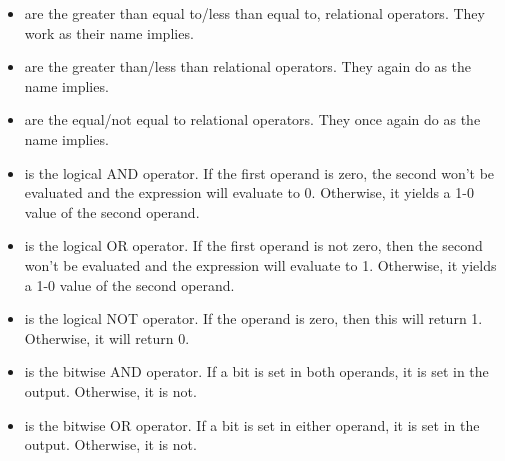 \begin{itemize}
	      \begin{itemize}
		    \item If the operand on the left is signed, then the integer is sign-extended.
          This means that if the number has the sign bit set, then any shift right will introduce ones on the left.
          If the number does not have the sign bit set, any shift right will introduce zeros on the left.
		      \item If the operand is unsigned, zeros will be introduced on the left either way.
	      \end{itemize}

	      \begin{lstlisting}[language=C]
unsigned short uns = -127; // 1111111110000001
short sig = 1; // 0000000000000001
uns << 2; // 1111111000000100
sig << 2; // 0000000000000100
uns >> 2; // 0011111111100000
sig >> 2; // 0000000000000000
\end{lstlisting}
    Note that shifting by the word size (e.g. by 64 in a 64-bit architecture) results in undefined behavior.
	\item \keyword{<=/>=} are the greater than equal to/less than equal to, relational operators.
    They work as their name implies.
	\item \keyword{</>} are the greater than/less than relational operators.
    They again do as the name implies.
	\item \keyword{==/\!=} are the equal/not equal to relational operators.
    They once again do as the name implies.
	\item \keyword{\&\&} is the logical AND operator.
    If the first operand is zero, the second won't be evaluated and the expression will evaluate to 0. Otherwise, it yields a 1-0 value of the second operand.
	\item \keyword{||} is the logical OR operator.
    If the first operand is not zero, then the second won't be evaluated and the expression will evaluate to 1.
    Otherwise, it yields a 1-0 value of the second operand.
	\item \keyword{!} is the logical NOT operator.
    If the operand is zero, then this will return 1.
    Otherwise, it will return 0.
	\item \keyword{\&} is the bitwise AND operator.
    If a bit is set in both operands, it is set in the output.
    Otherwise, it is not.
	\item \keyword{|} is the bitwise OR operator.
    If a bit is set in either operand, it is set in the output.
    Otherwise, it is not.

\end{itemize}

